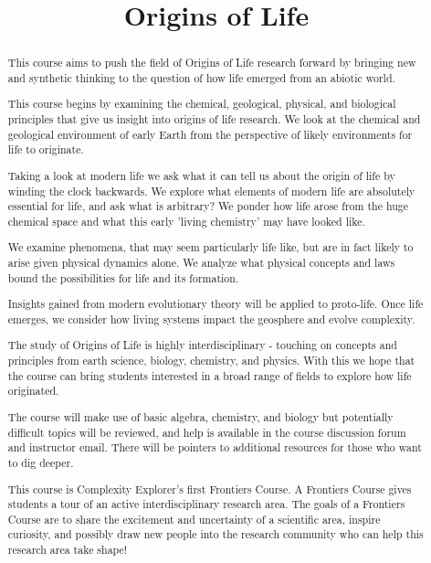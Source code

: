 \documentclass[]{article}
\title{Origins of Life}
\author{}
\begin{document}
\maketitle

\begin{abstract}
    This course aims to push the field of Origins of Life research forward by bringing new and synthetic thinking to the question of how life emerged from an abiotic world.

This course begins by examining the chemical, geological, physical, and biological principles that give us insight into origins of life research. We look at the chemical and geological environment of early Earth from the perspective of likely environments for life to originate.

Taking a look at modern life we ask what it can tell us about the origin of life by winding the clock backwards. We explore what elements of modern life are absolutely essential for life, and ask what is arbitrary? We ponder how life arose from the huge chemical space and what this early 'living chemistry' may have looked like.

We examine phenomena, that may seem particularly life like, but are in fact likely to arise given physical dynamics alone. We analyze what physical concepts and laws bound the possibilities for life and its formation.

Insights gained from modern evolutionary theory will be applied to proto-life. Once life emerges, we consider how living systems impact the geosphere and evolve complexity. 

The study of Origins of Life is highly interdisciplinary - touching on concepts and principles from earth science, biology, chemistry, and physics.  With this we hope that the course can bring students interested in a broad range of fields to explore how life originated. 

The course will make use of basic algebra, chemistry, and biology but potentially difficult topics will be reviewed, and help is available in the course discussion forum and instructor email. There will be pointers to additional resources for those who want to dig deeper.

This course is Complexity Explorer's first Frontiers Course.  A Frontiers Course gives students a tour of an active interdisciplinary research area. The goals of a Frontiers Course are to share the excitement and uncertainty of a scientific area, inspire curiosity, and possibly draw new people into the research community who can help this research area take shape!

\end{abstract}
\tableofcontents
\end{document}
